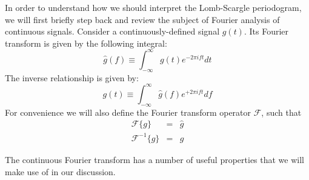 \documentclass[preprint]{aastex}
\newcommand{\eqlabel}[1]{\label{eq:#1}}
\begin{document}
In order to understand how we should interpret the Lomb-Scargle periodogram, we will first briefly step back and review the subject of Fourier analysis of continuous signals.
Consider a continuously-defined signal $g(t)$.
Its Fourier transform is given by the following integral:
\begin{equation}
    \hat{g}(f) \equiv \int_{-\infty}^\infty g(t) e^{-2\pi i f t} dt
    \eqlabel{FT-def}
\end{equation}
The inverse relationship is given by:
\begin{equation}
    g(t) \equiv \int_{-\infty}^\infty \hat{g}(f) e^{+2\pi i f t} df
    \eqlabel{IFT-def}
\end{equation}
For convenience we will also define the Fourier transform operator
$\mathcal{F}$, such that
\begin{eqnarray}
    \mathcal{F}\{g\} &=& \hat{g} \\
    \mathcal{F}^{-1}\{\hat{g}\} &=& g
\end{eqnarray}

The continuous Fourier transform has a number of useful properties that we will make use of in our discussion.
\end{document}
